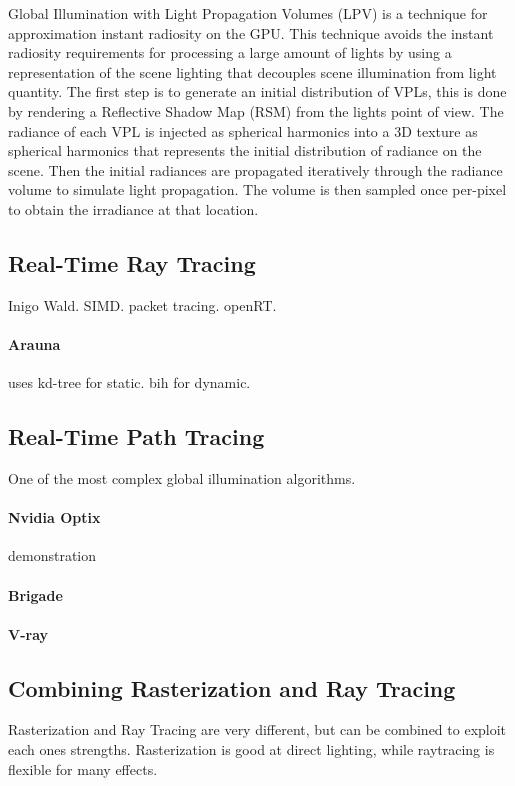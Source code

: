 	Global Illumination with Light Propagation Volumes (LPV) is a technique for approximation instant radiosity on the GPU. \cite{kaplanyan2009} This technique avoids the instant radiosity requirements for processing a large amount of lights by using a representation of the scene lighting that decouples scene illumination from light quantity. The first step is to generate an initial distribution of VPLs, this is done by rendering a Reflective Shadow Map (RSM) \cite{dachsbacher2005} from the lights point of view. The radiance of each VPL is injected as spherical harmonics into a 3D texture as spherical harmonics that represents the initial distribution of radiance on the scene. Then the initial radiances are propagated iteratively through the radiance volume to simulate light propagation. The volume is then sampled once per-pixel to obtain the irradiance at that location.

\subsection {Real-Time Ray Tracing}
	Inigo Wald. SIMD. packet tracing. openRT. 
	\paragraph{Arauna} uses kd-tree for static. bih for dynamic.

\subsection {Real-Time Path Tracing}
	One of the most complex global illumination algorithms. 
	\paragraph {Nvidia Optix} demonstration
	\paragraph {Brigade} 
	\paragraph {V-ray}

\subsection {Combining Rasterization and Ray Tracing}
	Rasterization and Ray Tracing are very different, but can be combined to exploit each ones strengths. Rasterization is good at direct lighting, while raytracing is flexible for many effects.

